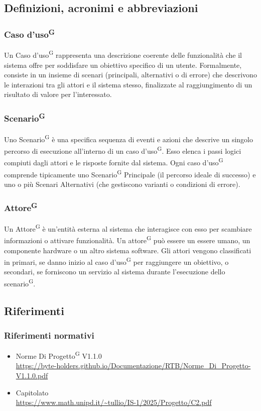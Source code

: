 \documentclass[a4paper, 11pt]{article}
\newcommand{\refterm}[1]{#1\textsuperscript{G}}
\newcommand{\term}[1]{\subsubsection{\refterm{#1}}}
\begin{document}
\subsection{Definizioni, acronimi e abbreviazioni}
\term{Caso d'uso}
Un Caso d'uso\textsuperscript{G} rappresenta una descrizione coerente delle funzionalità che il sistema offre per soddisfare un obiettivo specifico di un utente. Formalmente, consiste in un insieme di scenari (principali, alternativi o di errore) che descrivono le interazioni tra gli attori e il sistema stesso, finalizzate al raggiungimento di un risultato di valore per l'interessato.

\term{Scenario}
Uno Scenario\textsuperscript{G} è una specifica sequenza di eventi e azioni che descrive un singolo percorso di esecuzione all'interno di un caso d'uso\textsuperscript{G}. Esso elenca i passi logici compiuti dagli attori e le risposte fornite dal sistema. Ogni caso d'uso\textsuperscript{G} comprende tipicamente uno Scenario\textsuperscript{G} Principale (il percorso ideale di successo) e uno o più Scenari Alternativi (che gestiscono varianti o condizioni di errore).

\term{Attore}
Un Attore\textsuperscript{G} è un'entità esterna al sistema che interagisce con esso per scambiare informazioni o attivare funzionalità. Un attore\textsuperscript{G} può essere un essere umano, un componente hardware o un altro sistema software. Gli attori vengono classificati in primari, se danno inizio al caso d'uso\textsuperscript{G} per raggiungere un obiettivo, o secondari, se forniscono un servizio al sistema durante l'esecuzione dello scenario\textsuperscript{G}.

\subsection{Riferimenti}
\subsubsection{Riferimenti normativi}
\begin{itemize}
	\item 
		Norme Di Progetto\textsuperscript{G} V1.1.0\\
		\url{https://byte-holders.github.io/Documentazione/RTB/Norme_Di_Progetto-V1.1.0.pdf}
	\item
		Capitolato\\
		\url{https://www.math.unipd.it/~tullio/IS-1/2025/Progetto/C2.pdf}
\end{itemize}
\end{document}
